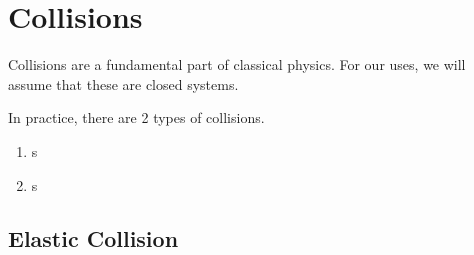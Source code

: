 \section{Collisions} \label{sec:Collisions}
Collisions are a fundamental part of classical physics.
For our uses, we will assume that these are closed systems.

In practice, there are 2 types of collisions.

\begin{enumerate}
  \item {}s
  \item {}s
\end{enumerate}

\subsection{Elastic Collision} \label{subsec:Elastic Collision}

